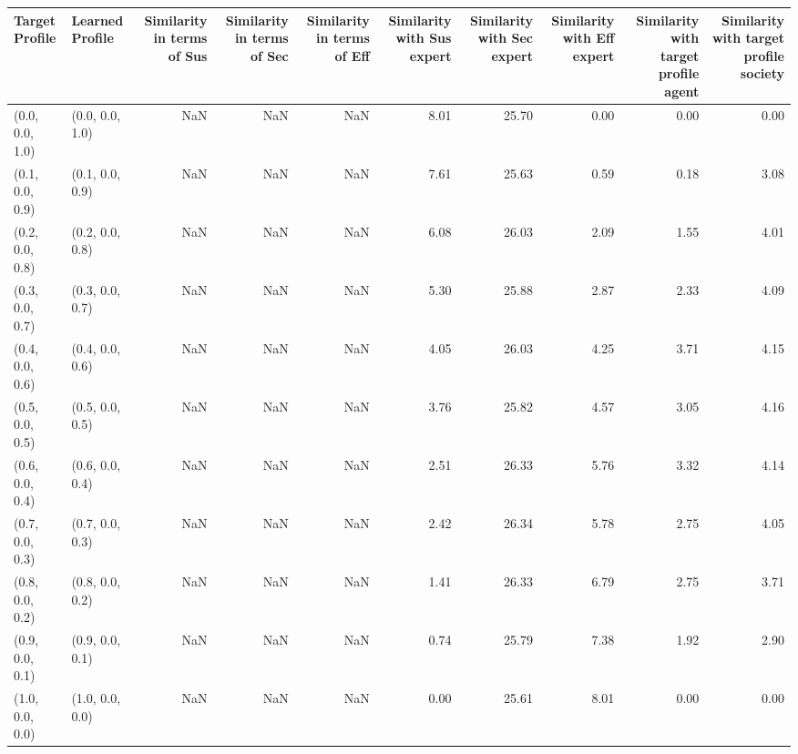 \begin{tabular}{llrrrrrrrr}
\toprule
Target Profile & Learned Profile & Similarity in terms of Sus & Similarity in terms of Sec & Similarity in terms of Eff & Similarity with Sus expert & Similarity with Sec expert & Similarity with Eff expert & Similarity with target profile agent & Similarity with target profile society \\
\midrule
(0.0, 0.0, 1.0) & (0.0, 0.0, 1.0) & NaN & NaN & NaN & 8.01 & 25.70 & 0.00 & 0.00 & 0.00 \\
(0.1, 0.0, 0.9) & (0.1, 0.0, 0.9) & NaN & NaN & NaN & 7.61 & 25.63 & 0.59 & 0.18 & 3.08 \\
(0.2, 0.0, 0.8) & (0.2, 0.0, 0.8) & NaN & NaN & NaN & 6.08 & 26.03 & 2.09 & 1.55 & 4.01 \\
(0.3, 0.0, 0.7) & (0.3, 0.0, 0.7) & NaN & NaN & NaN & 5.30 & 25.88 & 2.87 & 2.33 & 4.09 \\
(0.4, 0.0, 0.6) & (0.4, 0.0, 0.6) & NaN & NaN & NaN & 4.05 & 26.03 & 4.25 & 3.71 & 4.15 \\
(0.5, 0.0, 0.5) & (0.5, 0.0, 0.5) & NaN & NaN & NaN & 3.76 & 25.82 & 4.57 & 3.05 & 4.16 \\
(0.6, 0.0, 0.4) & (0.6, 0.0, 0.4) & NaN & NaN & NaN & 2.51 & 26.33 & 5.76 & 3.32 & 4.14 \\
(0.7, 0.0, 0.3) & (0.7, 0.0, 0.3) & NaN & NaN & NaN & 2.42 & 26.34 & 5.78 & 2.75 & 4.05 \\
(0.8, 0.0, 0.2) & (0.8, 0.0, 0.2) & NaN & NaN & NaN & 1.41 & 26.33 & 6.79 & 2.75 & 3.71 \\
(0.9, 0.0, 0.1) & (0.9, 0.0, 0.1) & NaN & NaN & NaN & 0.74 & 25.79 & 7.38 & 1.92 & 2.90 \\
(1.0, 0.0, 0.0) & (1.0, 0.0, 0.0) & NaN & NaN & NaN & 0.00 & 25.61 & 8.01 & 0.00 & 0.00 \\
\bottomrule
\end{tabular}
